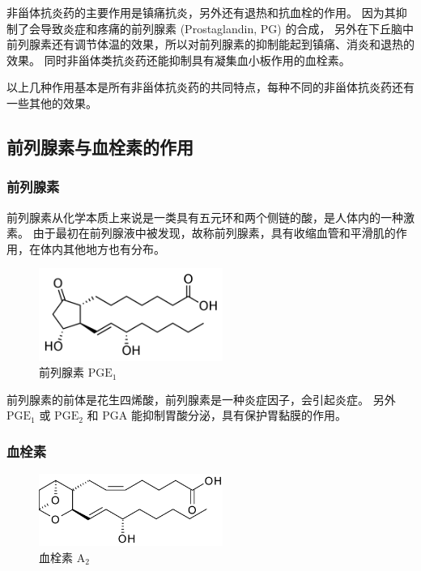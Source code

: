 \documentclass[12pt, a4paper, oneside]{ctexart}
\begin{document}
非甾体抗炎药的主要作用是镇痛抗炎，另外还有退热和抗血栓的作用。
因为其抑制了会导致炎症和疼痛的前列腺素 (Prostaglandin, PG) 的合成，
另外在下丘脑中前列腺素还有调节体温的效果，所以对前列腺素的抑制能起到镇痛、消炎和退热的效果。
同时非甾体类抗炎药还能抑制具有凝集血小板作用的血栓素。

以上几种作用基本是所有非甾体抗炎药的共同特点，每种不同的非甾体抗炎药还有一些其他的效果。

\subsection{前列腺素与血栓素的作用}
\subsubsection*{前列腺素}
前列腺素从化学本质上来说是一类具有五元环和两个侧链的酸，是人体内的一种激素。
由于最初在前列腺液中被发现，故称前列腺素，具有收缩血管和平滑肌的作用，在体内其他地方也有分布。

\begin{figure}[htbp]
    \centering
    \includegraphics[width=6cm]{Prostaglandin_E1.pdf}
    \caption{前列腺素 $\mathrm{PGE_1}$}
\end{figure} 

前列腺素的前体是花生四烯酸，前列腺素是一种炎症因子，会引起炎症。
另外 $\mathrm{PGE_1}$ 或 $\mathrm{PGE_2}$ 和 $\mathrm{PGA}$ 能抑制胃酸分泌，具有保护胃黏膜的作用。

\newpage

\subsubsection*{血栓素}

\begin{figure}[htbp]
    \centering
    \includegraphics[width=6cm]{Thromboxane_A2.png}
    \caption{血栓素 $\mathrm{A_2}$}
\end{figure} 
\end{document}

